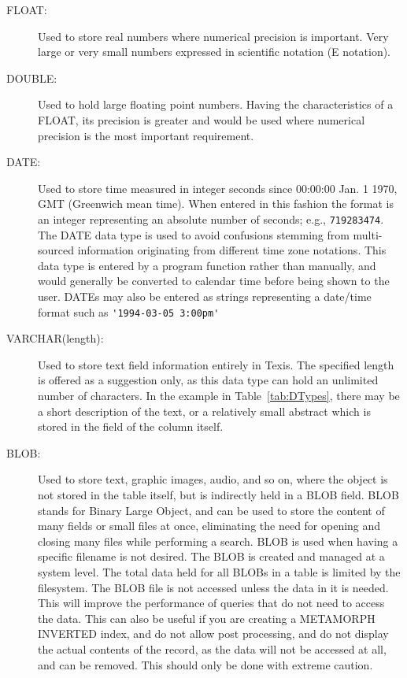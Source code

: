 \begin{description}
\begin{description}
\item[FLOAT:] Used to store real numbers where numerical precision is
important.  Very large or very small numbers expressed in scientific
notation (E notation).

\item[DOUBLE:] Used to hold large floating point numbers.  Having the
characteristics of a FLOAT, its precision is greater and would be used
where numerical precision is the most important requirement.

\item[DATE:] Used to store time measured in integer seconds since 00:00:00 Jan.
1 1970, GMT (Greenwich mean time).  When entered in this fashion the
format is an integer representing an absolute number of seconds; e.g.,
\verb`719283474`.  The DATE data type is used to avoid confusions
stemming from multi-sourced information originating from different time
zone notations.  This data type is entered by a program function rather
than manually, and would generally be converted to calendar time before
being shown to the user.  DATEs may also be entered as strings
representing a date/time format such as \verb`'1994-03-05 3:00pm'`

\item[VARCHAR(length):] Used to store text field information entirely
in Texis.  The specified length is offered as a suggestion only, as
this data type can hold an unlimited number of characters.  In the
example in Table~\ref{tab:DTypes}, there may be a short description of
the text, or a relatively small abstract which is stored in the field
of the column itself.

\item[BLOB:] Used to store text, graphic images, audio,
and so on, where the object is not stored in the table itself, but is
indirectly held in a BLOB field.  BLOB stands for
Binary Large Object, and can be used to store the content of many fields
or small files at once, eliminating the need for opening and closing
many files while performing a search.  BLOB is used when having a specific
filename is not desired.  The BLOB is created and managed at a system
level.  The total data held for all BLOBs in a table is limited by the
filesystem.  The BLOB file is not accessed unless the data in it is needed.
This will improve the performance of queries that do not need to access
the data.  This can also be useful if you are creating a METAMORPH
INVERTED index, and do not allow post processing, and do not display the
actual contents of the record, as the data will not be accessed at all,
and can be removed.  This should only be done with extreme caution.


\end{description}
\end{description}

